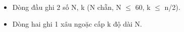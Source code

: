\begin{itemize}
	\item Dòng đầu ghi 2 số N, k (N chẵn, N  $\le$  60, k  $\le$  n/2).
	\item Dòng hai ghi 1 xâu ngoặc cấp k độ dài N.
\end{itemize}